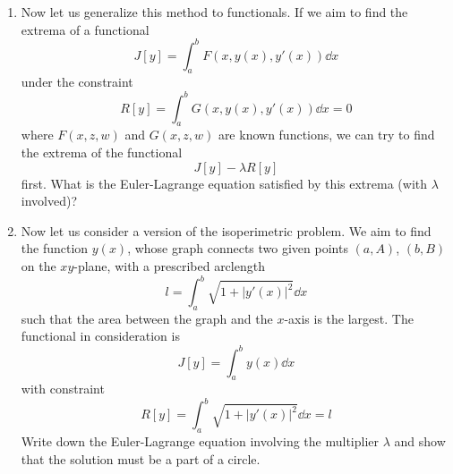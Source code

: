 \documentclass[../psets.tex]{subfiles}
\begin{document}
\begin{enumerate}
\begin{enumerate}
        \item Now let us generalize this method to functionals. If we aim to find the extrema of a functional
        \begin{equation*}
            J[y] = \int_a^bF(x,y(x),y'(x))\dd{x}
        \end{equation*}
        under the constraint
        \begin{equation*}
            R[y] = \int_a^bG(x,y(x),y'(x))\dd{x} = 0
        \end{equation*}
        where $F(x,z,w)$ and $G(x,z,w)$ are known functions, we can try to find the extrema of the functional
        \begin{equation*}
            J[y]-\lambda R[y]
        \end{equation*}
        first. What is the Euler-Lagrange equation satisfied by this extrema (with $\lambda$ involved)?
        \item Now let us consider a version of the isoperimetric problem. We aim to find the function $y(x)$, whose graph connects two given points $(a,A)$, $(b,B)$ on the $xy$-plane, with a prescribed arclength
        \begin{equation*}
            l = \int_a^b\sqrt{1+|y'(x)|^2}\dd{x}
        \end{equation*}
        such that the area between the graph and the $x$-axis is the largest. The functional in consideration is
        \begin{equation*}
            J[y] = \int_a^by(x)\dd{x}
        \end{equation*}
        with constraint
        \begin{equation*}
            R[y] = \int_a^b\sqrt{1+|y'(x)|^2}\dd{x} = l
        \end{equation*}
        Write down the Euler-Lagrange equation involving the multiplier $\lambda$ and show that the solution must be a part of a circle.
    \end{enumerate}
\end{enumerate}
\end{document}
